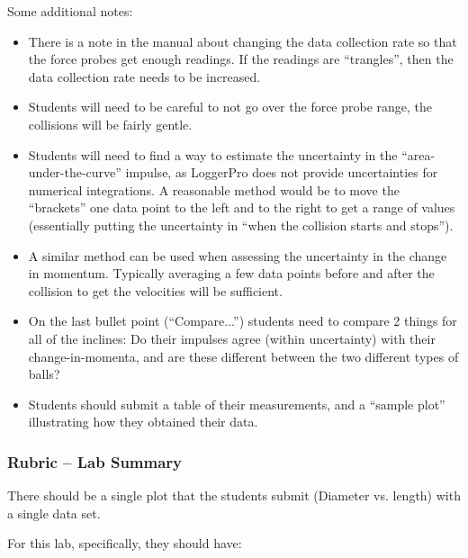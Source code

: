 \documentclass[fleqn,letterpaper]{article}
\begin{document}
Some additional notes:

\begin{itemize}
\item{There is a note in the manual about changing the data collection rate so that the force probes get enough readings.  If the readings are ``trangles'', then the data collection rate needs to be increased.}
\item{Students will need to be careful to not go over the force probe range, the collisions will be fairly gentle.}
\item{Students will need to find a way to estimate the uncertainty in the ``area-under-the-curve'' impulse, as LoggerPro does not provide uncertainties for numerical integrations.  A reasonable method would be to move the ``brackets'' one data point to the left and to the right to get a range of values (essentially putting the uncertainty in ``when the collision starts and stops'').}
\item{A similar method can be used when assessing the uncertainty in the change in momentum.  Typically averaging a few data points before and after the collision to get the velocities will be sufficient.}
\item{On the last bullet point (``Compare...'') students need to compare 2 things for all of the inclines:  Do their impulses agree (within uncertainty) with their change-in-momenta, and are these different between the two different types of balls?}
\item{Students should submit a table of their measurements, and a ``sample plot'' illustrating how they obtained their data.}
\end{itemize}

\subsubsection*{Rubric -- Lab Summary}

There should be a single plot that the students submit (Diameter vs. length) with a single data set.

For this lab, specifically, they should have:
\end{document}
